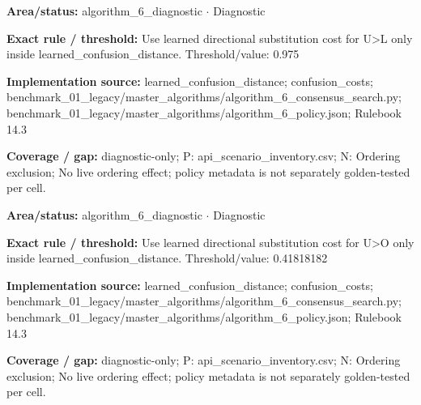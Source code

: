 \begin{tcolorbox}[enhanced,breakable,colback=white,colframe=Muted!45,boxrule=0.45pt,arc=1.5pt,left=6pt,right=6pt,top=5pt,bottom=5pt,title={\texttt{A6-LEARNED-SUBSTITUTION-U-L}},title after break={\texttt{A6-LEARNED-SUBSTITUTION-U-L}\ (continued)},fonttitle=\headingfont\bfseries\color{Navy},coltitle=Navy]
\textbf{Area/status:} algorithm\_\allowbreak{}6\_\allowbreak{}diagnostic $\boldsymbol{\cdot}$ Diagnostic\par
\smallskip
\textbf{Exact rule / threshold:} Use learned directional substitution cost for U>L only inside learned\_\allowbreak{}confusion\_\allowbreak{}distance. Threshold/\allowbreak{}value: 0.975\par
\smallskip
\textbf{Implementation source:} learned\_\allowbreak{}confusion\_\allowbreak{}distance; confusion\_\allowbreak{}costs; benchmark\_\allowbreak{}01\_\allowbreak{}legacy/\allowbreak{}master\_\allowbreak{}algorithms/\allowbreak{}algorithm\_\allowbreak{}6\_\allowbreak{}consensus\_\allowbreak{}search.py; benchmark\_\allowbreak{}01\_\allowbreak{}legacy/\allowbreak{}master\_\allowbreak{}algorithms/\allowbreak{}algorithm\_\allowbreak{}6\_\allowbreak{}policy.json; Rulebook 14.3\par
\smallskip
\textbf{Coverage / gap:} diagnostic-only; P: api\_\allowbreak{}scenario\_\allowbreak{}inventory.csv; N: Ordering exclusion; No live ordering effect; policy metadata is not separately golden-tested per cell.
\end{tcolorbox}
\begin{tcolorbox}[enhanced,breakable,colback=white,colframe=Muted!45,boxrule=0.45pt,arc=1.5pt,left=6pt,right=6pt,top=5pt,bottom=5pt,title={\texttt{A6-LEARNED-SUBSTITUTION-U-O}},title after break={\texttt{A6-LEARNED-SUBSTITUTION-U-O}\ (continued)},fonttitle=\headingfont\bfseries\color{Navy},coltitle=Navy]
\textbf{Area/status:} algorithm\_\allowbreak{}6\_\allowbreak{}diagnostic $\boldsymbol{\cdot}$ Diagnostic\par
\smallskip
\textbf{Exact rule / threshold:} Use learned directional substitution cost for U>O only inside learned\_\allowbreak{}confusion\_\allowbreak{}distance. Threshold/\allowbreak{}value: 0.41818182\par
\smallskip
\textbf{Implementation source:} learned\_\allowbreak{}confusion\_\allowbreak{}distance; confusion\_\allowbreak{}costs; benchmark\_\allowbreak{}01\_\allowbreak{}legacy/\allowbreak{}master\_\allowbreak{}algorithms/\allowbreak{}algorithm\_\allowbreak{}6\_\allowbreak{}consensus\_\allowbreak{}search.py; benchmark\_\allowbreak{}01\_\allowbreak{}legacy/\allowbreak{}master\_\allowbreak{}algorithms/\allowbreak{}algorithm\_\allowbreak{}6\_\allowbreak{}policy.json; Rulebook 14.3\par
\smallskip
\textbf{Coverage / gap:} diagnostic-only; P: api\_\allowbreak{}scenario\_\allowbreak{}inventory.csv; N: Ordering exclusion; No live ordering effect; policy metadata is not separately golden-tested per cell.
\end{tcolorbox}
